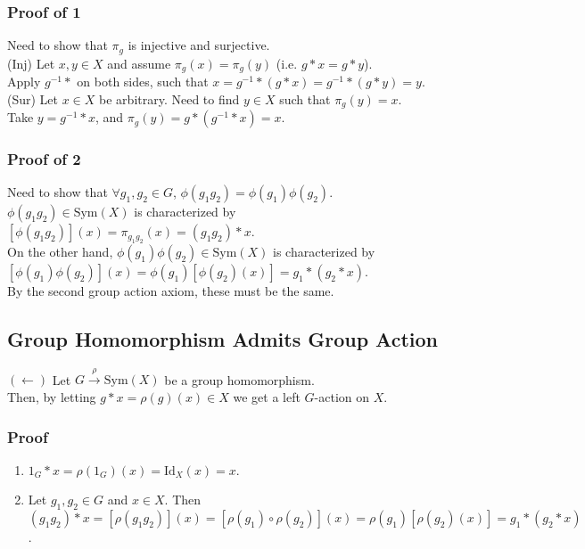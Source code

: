 \documentclass[11pt]{article}
\newcommand{\0}{\emptyset}
\begin{document}
\subsubsection*{Proof of 1}
\label{sec:org8da6692}
Need to show that \(\pi_{g}\) is injective and surjective.\\[0pt]
(Inj) Let \(x,y\in X\) and assume \(\pi_{g}(x)=\pi_{g}(y)\) (i.e. \(g*x=g*y\)).\\[0pt]
Apply \(g^{-1}*\) on both sides, such that \(x=g^{-1}*(g*x)=g^{-1}*(g*y)=y\).\\[0pt]
(Sur) Let \(x\in X\) be arbitrary. Need to find \(y\in X\) such that \(\pi_{g}(y)=x\).\\[0pt]
Take \(y=g^{-1}*x\), and \(\pi_{g}(y)=g*(g^{-1}*x)=x\).\\[0pt]
\subsubsection*{Proof of 2}
\label{sec:org8df6bf9}
Need to show that \(\forall g_{1},g_{2}\in G\), \(\phi(g_{1}g_{2})=\phi(g_{1})\phi(g_{2})\).\\[0pt]
\(\phi(g_{1}g_{2})\in\text{Sym}(X)\) is characterized by \([\phi(g_{1}g_{2})](x)=\pi_{g_{1}g_{2}}(x)=(g_{1}g_{2})*x\).\\[0pt]
On the other hand, \(\phi(g_{1})\phi(g_{2})\in\text{Sym}(X)\) is characterized by \([\phi(g_{1})\phi(g_{2})](x)=\phi(g_{1})[\phi(g_{2})(x)]=g_{1}*(g_{2}*x)\).\\[0pt]
By the second group action axiom, these must be the same.\\[0pt]
\subsection*{Group Homomorphism Admits Group Action}
\label{sec:org9309ce5}
\((\longleftarrow)\) Let \(G\overset{\rho}{\to}\text{Sym}(X)\) be a group homomorphism.\\[0pt]
Then, by letting \(g*x=\rho(g)(x)\in X\) we get a left \(G\)-action on \(X\).\\[0pt]
\subsubsection*{Proof}
\label{sec:org3ded20e}
\begin{enumerate}
\item \(1_{G}*x=\rho(1_{G})(x)=\text{Id}_{X}(x)=x\).\\[0pt]
\item Let \(g_{1},g_{2}\in G\) and \(x\in X\). Then \((g_{1}g_{2})*x=[\rho(g_{1}g_{2})](x)=[\rho(g_{1})\circ\rho(g_{2})](x)=\rho(g_{1})[\rho(g_{2})(x)]=g_{1}*(g_{2}*x)\).\\[0pt]
\end{enumerate}
\end{document}
